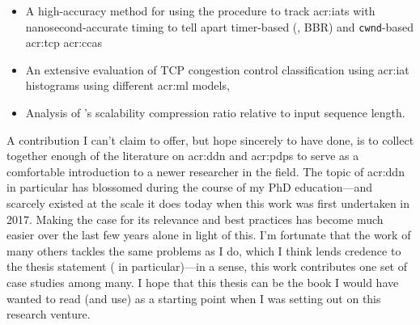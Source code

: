 \begin{itemize}
\begin{itemize}
		\item A high-accuracy method for using the \seidr{} procedure to track \glspl{acr:iat} with nanosecond-accurate timing to tell apart timer-based (\eg, BBR) and \texttt{cwnd}-based \gls{acr:tcp} \glspl{acr:cca}
		\item An extensive evaluation of TCP congestion control classification using \gls{acr:iat} histograms using different \gls{acr:ml} models,
		\item Analysis of \seidr's scalability compression ratio relative to input sequence length.
	\end{itemize}
\end{itemize}

A contribution I can't claim to offer, but hope sincerely to have done, is to collect together enough of the literature on \gls{acr:ddn} and \glspl{acr:pdp} to serve as a comfortable introduction to a newer researcher in the field.
The topic of \gls{acr:ddn} in particular has blossomed during the course of my PhD education---and scarcely existed at the scale it does today when this work was first undertaken in 2017.
Making the case for its relevance and best practices has become much easier over the last few years alone in light of this.
I'm fortunate that the work of many others tackles the same problems as I do, which I think lends credence to the thesis statement ( in particular)---in a sense, this work contributes one set of case studies among many.
I hope that this thesis can be the book I would have wanted to read (and use) as a starting point when I was setting out on this research venture.


%

